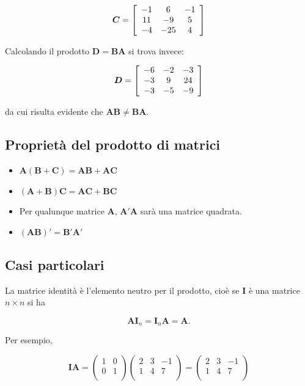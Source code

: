 \documentclass[
  11pt,
]{krantz}
\theoremstyle{definition}
\theoremstyle{definition}
\theoremstyle{definition}
\theoremstyle{definition}
\theoremstyle{remark}
\begin{document}
\[\boldsymbol{C} =  \left[ \begin{array}{c c c}
-1 & 6 & -1\\
11 & -9 & 5\\
-4 & -25 & 4
\end{array}
 \right]\]

Calcolando il prodotto \(\boldsymbol{D} = \boldsymbol{BA}\) si trova invece:

\[\boldsymbol{D} =  \left[ \begin{array}{c c c}
-6 & -2 & -3\\
-3 & 9 & 24\\
-3 & -5 & -9
\end{array}
 \right]\]

da cui risulta evidente che \(\boldsymbol{AB} \neq \boldsymbol{BA}\).

\hypertarget{proprietuxe0-del-prodotto-di-matrici}{%
\subsection{Proprietà del prodotto di matrici}\label{proprietuxe0-del-prodotto-di-matrici}}

\begin{itemize}
\item
  \(\boldsymbol{A}(\boldsymbol{B} + \boldsymbol{C}) = \boldsymbol{AB} +  \boldsymbol{AC}\)
\item
  \((\boldsymbol{A} + \boldsymbol{B})\boldsymbol{C} = \boldsymbol{AC} +  \boldsymbol{BC}\)
\item
  Per qualunque matrice \(\boldsymbol{A}\), \(\boldsymbol{A}'\boldsymbol{A}\) sarà una matrice quadrata.
\item
  \((\boldsymbol{AB})' = \boldsymbol{B}'\boldsymbol{A}'\)
\end{itemize}

\hypertarget{casi-particolari}{%
\subsection{Casi particolari}\label{casi-particolari}}

La matrice identità è l'elemento neutro per il prodotto, cioè se \(\boldsymbol{I}\) è una matrice \(n \times n\) si ha

\[\boldsymbol{A} \boldsymbol{I}_n = \boldsymbol{I}_n \boldsymbol{A}
= \boldsymbol{A}.\]

Per esempio,

\[\boldsymbol{IA} = \left(%
\begin{array}{cc}
  1 & 0 \\
  0 & 1 \\
\end{array}%
\right)
\left(%
\begin{array}{ccc}
  2 & 3 & -1 \\
  1 & 4 & 7 \\
\end{array}%
\right)=
\left(%
\begin{array}{ccc}
  2 & 3 & -1 \\
  1 & 4 & 7 \\
\end{array}%
\right)\]
\end{document}
